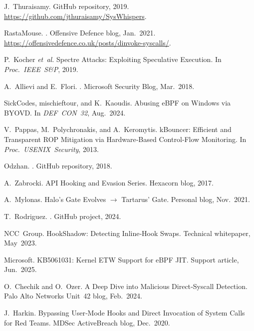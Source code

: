 \documentclass[11pt,letterpaper]{article}
\begin{document}

\begin{thebibliography}{14}

J.~Thuraisamy.
\newblock GitHub repository, 2019.
\newblock \url{https://github.com/jthuraisamy/SysWhispers}.

RastaMouse.
.
\newblock Offensive Defence blog, Jan.\ 2021.
\newblock \url{https://offensivedefence.co.uk/posts/dinvoke-syscalls/}.

P.~Kocher \emph{et~al.}
\newblock Spectre Attacks: Exploiting Speculative Execution.
\newblock In {\em Proc.\ IEEE S\&P}, 2019.

A.~Allievi and E.~Flori.
.
\newblock Microsoft Security Blog, Mar.\ 2018.

SickCodes, mischieftour, and K.~Kaoudis.
\newblock Abusing eBPF on Windows via BYOVD.
\newblock In {\em DEF CON 32}, Aug.\ 2024.

V.~Pappas, M.~Polychronakis, and A.~Keromytis.
\newblock kBouncer: Efficient and Transparent ROP Mitigation via Hardware‑Based Control‑Flow Monitoring.
\newblock In {\em Proc.\ USENIX Security}, 2013.

Odzhan.
.
\newblock GitHub repository, 2018.

A.~Zabrocki.
\newblock API Hooking and Evasion Series.
\newblock Hexacorn blog, 2017.

A.~Mylonas.
\newblock Halo's Gate Evolves $\rightarrow$ Tartarus' Gate.
\newblock Personal blog, Nov.\ 2021.

T.~Rodriguez.
.
\newblock GitHub project, 2024.

NCC~Group.
\newblock HookShadow: Detecting Inline‑Hook Swaps.
\newblock Technical whitepaper, May 2023.

Microsoft.
\newblock KB5061031: Kernel ETW Support for eBPF JIT.
\newblock Support article, Jun.\ 2025.

O.~Chechik and O.~Ozer.
\newblock A Deep Dive into Malicious Direct‑Syscall Detection.
\newblock Palo Alto Networks Unit~42 blog, Feb.\ 2024.

J.~Harkin.
\newblock Bypassing User‑Mode Hooks and Direct Invocation of System Calls for Red Teams.
\newblock MDSec ActiveBreach blog, Dec.\ 2020.

\end{thebibliography}
\end{document}
